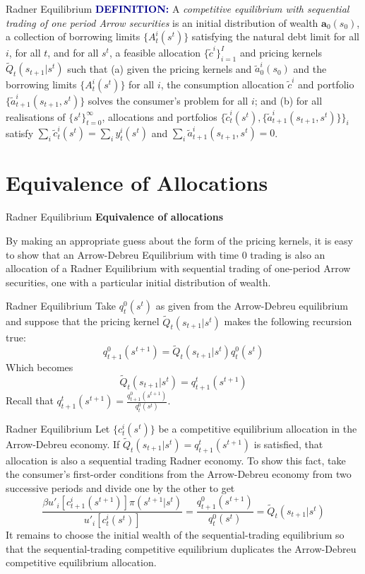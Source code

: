 \documentclass[aspectratio=169,xcolor=dvipsnames]{beamer}
\begin{document}
\begin{frame}{Radner Equilibrium}
    \textcolor{darkblue}{\textbf{DEFINITION:}} A \emph{competitive equilibrium with sequential trading of one period Arrow securities} is an initial distribution of wealth $\mathbf{a}_0(s_0)$, a collection of borrowing limits $\{A^i_t(s^t)\}$ satisfying the natural debt limit for all $i$, for all $t$, and for all $s^t$, a feasible allocation $\{\tilde c^i\}_{i=1}^I$ and pricing kernels $\tilde Q_t(s_{t+1} | s^t)$ such that (a) given the pricing kernels and $\tilde a^i_0(s_0)$ and the borrowing limits $\{A^i_t(s^t)\}$ for all $i$, the consumption allocation $\tilde c^i$ and portfolio $\{\tilde a^i_{t+1}(s_{t+1}, s^t)\}$ solves the consumer's problem for all $i$; and (b) for all realisations of $\{s^t\}_{t=0}^\infty$, allocations and portfolios $\{\tilde c^i_t(s^t), \{\tilde a^i_{t+1}(s_{t+1}, s^t)\}\}_i$ satisfy $\sum_i \tilde c^i_t(s^t) = \sum_i y^i_t(s^t)$ and $\sum_i \tilde a^i_{t+1}(s_{t+1}, s^t) = 0$.
\end{frame}

\section{Equivalence of Allocations}

\begin{frame}{Radner Equilibrium}
    \textbf{Equivalence of allocations}

    By making an appropriate guess about the form of the pricing kernels, it is easy to show that an Arrow-Debreu Equilibrium with time 0 trading is also an allocation of a Radner Equilibrium with sequential trading of one-period Arrow securities, one with a particular initial distribution of wealth.
\end{frame}

\begin{frame}{Radner Equilibrium}
    Take $q^0_t(s^t)$ as given from the Arrow-Debreu equilibrium and suppose that the pricing kernel $\tilde Q_t(s_{t+1} | s^t)$ makes the following recursion true:
    \[
        q^0_{t+1}(s^{t+1}) = \tilde Q_t(s_{t+1} | s^t) q^0_t(s^t)
    \]
    Which becomes
    \[
        \tilde Q_t(s_{t+1} | s^t) = q^t_{t+1}(s^{t+1})
    \]
    Recall that $q^t_{t+1}(s^{t+1}) = \frac{q^0_{t+1}(s^{t+1})}{q^0_t(s^t)}$.
\end{frame}

\begin{frame}{Radner Equilibrium}
    Let $\{c^i_t(s^t)\}$ be a competitive equilibrium allocation in the Arrow-Debreu economy. If $\tilde Q_t(s_{t+1} | s^t) = q^t_{t+1}(s^{t+1})$ is satisfied, that allocation is also a sequential trading Radner economy. To show this fact, take the consumer's first-order conditions from the Arrow-Debreu economy from two successive periods and divide one by the other to get
    \[
        \frac{\beta u'_i[c^i_{t+1}(s^{t+1})] \pi(s^{t+1} | s^t)}{u'_i[c^i_t(s^t)]} = \frac{q^0_{t+1}(s^{t+1})}{q^0_t(s^t)} = \tilde Q_t(s_{t+1} | s^t)
    \]
    It remains to choose the initial wealth of the sequential-trading equilibrium so that the sequential-trading competitive equilibrium duplicates the Arrow-Debreu competitive equilibrium allocation.
\end{frame}
\end{document}
